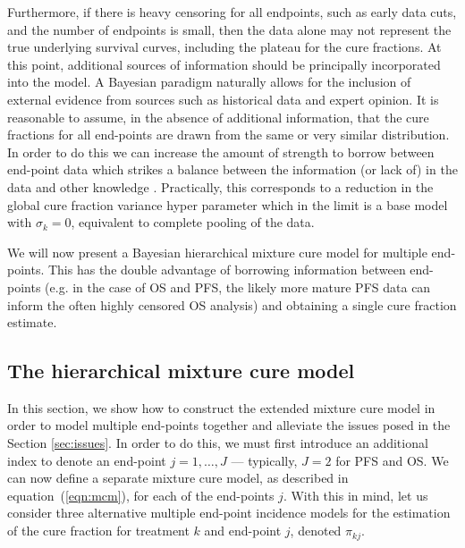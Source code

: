\documentclass[AMA,STIX1COL]{WileyNJD-v2}
\begin{document}
Furthermore, if there is heavy censoring for all endpoints, such as early data cuts, and the number of endpoints is small, then the data alone may not represent the true underlying survival curves, including the plateau for the cure fractions.
At this point, additional sources of information should be principally incorporated into the model. A Bayesian paradigm naturally allows for the inclusion of external evidence from sources such as historical data and expert opinion. It is reasonable to assume, in the absence of additional information, that the cure fractions for all end-points are drawn from the same or very similar distribution. In order to do this we can increase the amount of strength to borrow between end-point data which strikes a balance between the information (or lack of) in the data and other knowledge \cite{Nikolaidis2021}. Practically, this corresponds to a reduction in the global cure fraction variance hyper parameter which in the limit is a base model with $\sigma_k=0$, equivalent to complete pooling of the data. 

We will now present a Bayesian hierarchical mixture cure model for multiple end-points.
This has the double advantage of borrowing information between end-points
(e.g. in the case of OS and PFS, the likely more mature PFS data can inform the often highly censored OS analysis) and obtaining a single cure fraction estimate.

%
\subsection{The hierarchical mixture cure model} \label{sec:hier_model}
In this section, we show how to construct the extended mixture cure model in order to model multiple end-points together and alleviate the issues posed in the Section \ref{sec:issues}.
In order to do this, we must first introduce an additional index to denote an end-point $j = 1, \ldots, J$ --- typically, $J=2$ for PFS and OS.
We can now define a separate mixture cure model, as described in equation~(\ref{eqn:mcm}), for each of the end-points $j$.
With this in mind, let us consider three alternative multiple end-point incidence models for the estimation of the cure fraction for treatment $k$ and end-point $j$, denoted $\pi_{kj}$.
\end{document}
